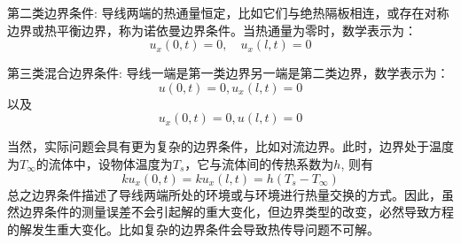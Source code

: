 第二类边界条件: 导线两端的热通量恒定，比如它们与绝热隔板相连，或存在对称边界或热平衡边界，称为诺依曼边界条件。当热通量为零时，数学表示为：
\begin{equation}
	u_x (0,t) =0, \quad u_x (l,t)=0
\end{equation}
 
第三类混合边界条件: 导线一端是第一类边界另一端是第二类边界，数学表示为：
\begin{equation}
	u (0,t) =0, u_x (l,t)=0 
\end{equation} 
以及
\begin{equation}
	u_x (0,t) =0, u (l,t)=0 
\end{equation} 

当然，实际问题会具有更为复杂的边界条件，比如对流边界。此时，边界处于温度为$T_\infty $的流体中，设物体温度为$T_s$，它与流体间的传热系数为$h$, 则有 
\begin{equation}
	k u_x (0,t) = k u_x(l,t)= h (T_s - T_\infty) 
\end{equation} 
总之边界条件描述了导线两端所处的环境或与环境进行热量交换的方式。因此，虽然边界条件的测量误差不会引起解的重大变化，但边界类型的改变，必然导致方程的解发生重大变化。比如复杂的边界条件会导致热传导问题不可解。
~~\\ 

